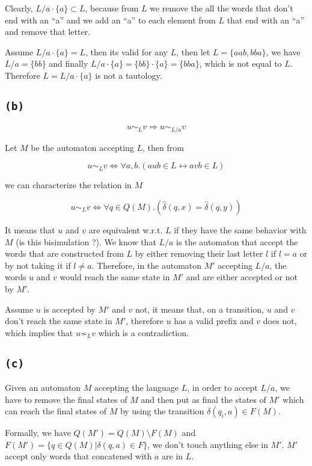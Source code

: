 \documentclass[a4paper,11pt]{report}
\begin{document}
Clearly, $L/a \cdot \{a\} \subset L$, because from $L$ we remove the all the
words that don't end with an ``a'' and we add an ``a'' to each element from $L$
that end with an ``a'' and remove that letter.

Assume $L/a \cdot \{a\} = L$, then its valid for any $L$, then let $L =
\{aab,bba\}$, we have $L/a = \{bb\}$ and finally $L/a \cdot \{a\} = \{bb\} \cdot
\{a\} = \{bba\}$, which is not equal to $L$. Therefore $L = L/a \cdot \{a\}$ is
not a tautology.

\subsection*{\texttt{(b)}}

\[
  u \sim_L v \Rightarrow u \sim_{L/a} v
\]

Let $M$ be the automaton accepting $L$, then from

\[
  u \sim_L v \Leftrightarrow \forall a,b.(aub \in L \leftrightarrow avb \in L)
\]

we can characterize the relation in $M$

\[
  u \sim_L v \Leftrightarrow \forall q \in Q(M).( \hat\delta(q,x) = \hat\delta(q,y) )
\]

It means that $u$ and $v$ are equivalent w.r.t. $L$ if they have the same
behavior with $M$ (is this bisimulation ?). We know that $L/a$ is the automaton
that accept the words that are constructed from $L$ by either removing their
last letter $l$ if $l=a$ or by not taking it if $l \not= a$. Therefore, in the
automaton $M'$ accepting $L/a$, the words $u$ and $v$ would reach the same state
in $M'$ and are either accepted or not by $M'$.

Assume $u$ is accepted by $M'$ and $v$ not, it means that, on a transition, $u$
and $v$ don't reach the same state in $M'$, therefore $u$ has a valid prefix and
$v$ does not, which implies that $u \not\sim_L v$ which is a contradiction.

\subsection*{\texttt{(c)}}

Given an automaton $M$ accepting the language $L$, in order to accept $L/a$, we
have to remove the final states of $M$ and then put as final the states of $M'$
which can reach the final states of $M$ by using the transition $\delta(q_i,a)
\in F(M)$.

Formally, we have $Q(M') = Q(M) \setminus F(M)$ and
$F(M') = \{q \in Q(M) | \delta(q,a) \in F\}$, we don't touch anything else in
$M'$. $M'$ accept only words that concatened with $a$ are in $L$.
\end{document}
